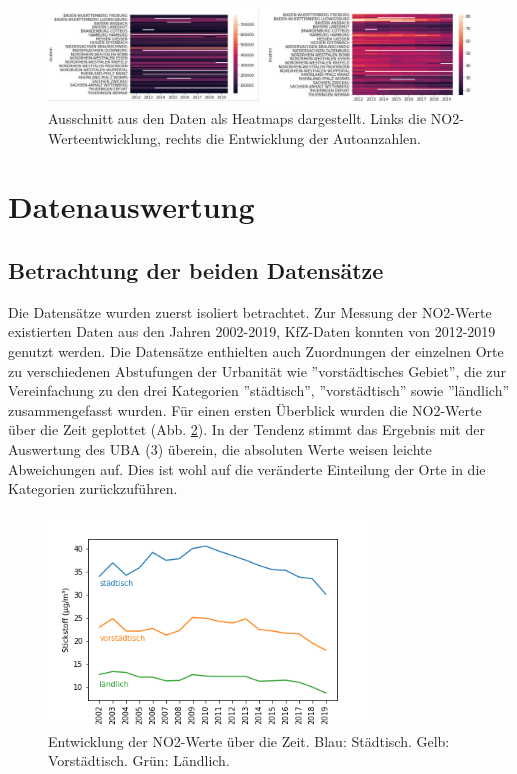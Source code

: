 \documentclass[11pt,a4paper,oneside,german]{article}
\begin{document}
	\begin{figure}[h!]
		\centering
		\includegraphics[width=12cm]{Heatmaps.png}
		\caption{Ausschnitt aus den Daten als Heatmaps dargestellt. Links die NO2-Werteentwicklung, rechts die Entwicklung der Autoanzahlen.}
		\label{fig:Heatmaps}
	\end{figure}
	
	\section{Datenauswertung}
	
	\subsection{Betrachtung der beiden Datensätze}
	
	Die Datensätze wurden zuerst isoliert betrachtet. Zur Messung der NO2-Werte existierten Daten aus den Jahren 2002-2019, KfZ-Daten konnten von 2012-2019 genutzt werden. Die  Datensätze enthielten auch Zuordnungen der einzelnen Orte zu verschiedenen Abstufungen der Urbanität wie ''vorstädtisches Gebiet'', die zur Vereinfachung zu den drei Kategorien ''städtisch'', ''vorstädtisch'' sowie ''ländlich'' zusammengefasst wurden. Für einen ersten Überblick wurden die NO2-Werte über die Zeit geplottet (Abb. \ref{fig:NO2Entwicklung}). In der Tendenz stimmt das Ergebnis mit der Auswertung des UBA (3) überein, die absoluten Werte weisen leichte Abweichungen auf. Dies ist wohl auf die veränderte Einteilung der Orte in die Kategorien zurückzuführen.\\
	
	\begin{figure}[h!]
		\centering
		\includegraphics[width=8.5cm]{Stickstoff_jahre.png}
		\caption{Entwicklung der NO2-Werte über die Zeit. Blau: Städtisch. Gelb: Vorstädtisch. Grün: Ländlich.}
		\label{fig:NO2Entwicklung}
	\end{figure}
	
\end{document}
